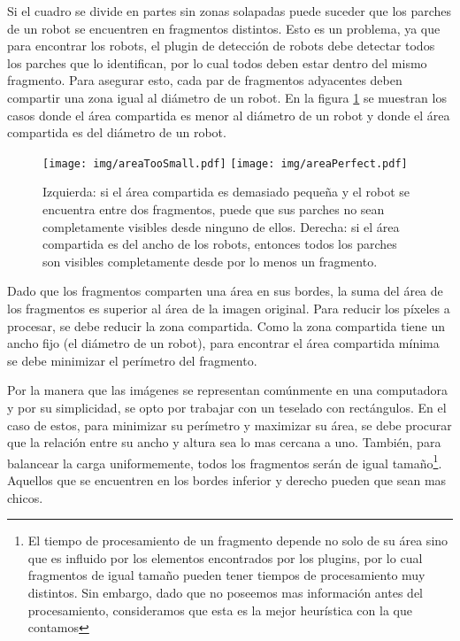 Si el cuadro se divide en partes sin zonas solapadas puede suceder que los
parches de un robot se encuentren en fragmentos distintos. Esto es un problema,
ya que para encontrar los robots, el plugin de detección de robots debe detectar
todos los parches que lo identifican, por lo cual todos deben estar dentro del
mismo fragmento. Para asegurar esto, cada par de fragmentos adyacentes deben
compartir una zona igual al diámetro de un robot. En la figura
\ref{areaCompartida} se muestran los casos donde el área compartida es menor al
diámetro de un robot y donde el área compartida es del diámetro de un robot.

\begin{figure}[!h]

	\centering
	\texttt{[image: img/areaTooSmall.pdf]}
	\texttt{[image: img/areaPerfect.pdf]}

	\caption{Izquierda: si el área compartida es demasiado pequeña y el
	robot se encuentra entre dos fragmentos, puede que sus parches no sean
	completamente visibles desde ninguno de ellos. Derecha: si el área
	compartida es del ancho de los robots, entonces todos los parches son
	visibles completamente desde por lo menos un fragmento.}

	\label{areaCompartida}

\end{figure}

Dado que los fragmentos comparten una área en sus bordes, la suma del área de
los fragmentos es superior al área de la imagen original. Para reducir los
píxeles a procesar, se debe reducir la zona compartida. Como la zona compartida
tiene un ancho fijo (el diámetro de un robot), para encontrar el área compartida
mínima se debe minimizar el perímetro del fragmento.

Por la manera que las imágenes se representan comúnmente en una computadora y
por su simplicidad, se opto por trabajar con un teselado con rectángulos. En el
caso de estos, para minimizar su perímetro y maximizar su área, se debe procurar
que la relación entre su ancho y altura sea lo mas cercana a uno. También,
para balancear la carga uniformemente, todos los fragmentos serán de igual
tamaño\footnote{El tiempo de procesamiento de un fragmento depende no solo de su
área sino que es influido por los elementos encontrados por los plugins, por lo
cual fragmentos de igual tamaño pueden tener tiempos de procesamiento muy
distintos. Sin embargo, dado que no poseemos mas información antes del
procesamiento, consideramos que esta es la mejor heurística con la que
contamos}. Aquellos que se encuentren en los bordes inferior y derecho pueden
que sean mas chicos.

